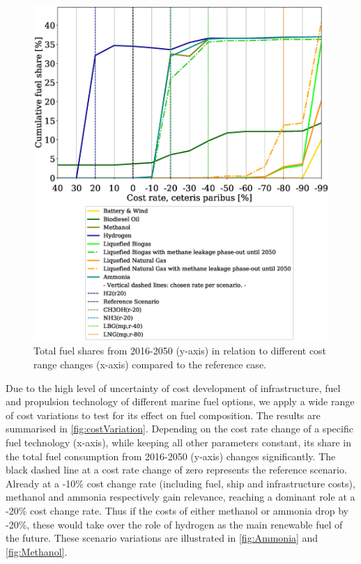 \documentclass[article]{elsarticle}
\begin{document}
\begin{figure}[t]
    \centering
    \includegraphics[width=.75\textwidth]{figures/costVariation.eps}
    \caption{Total fuel shares from 2016-2050 (y-axis) in relation to different cost range changes (x-axis) compared to the reference case.}
    \label{fig:costVariation}
\end{figure}



Due to the high level of uncertainty of cost development of infrastructure, fuel and propulsion technology of different marine fuel options, we apply a wide range of cost variations to test for its effect on fuel composition. The results are summarised in \autoref{fig:costVariation}. Depending on the cost rate change of a specific fuel technology (x-axis), while keeping all other parameters constant, its share in the total fuel consumption from 2016-2050 (y-axis) changes significantly. The black dashed line at a cost rate change of zero represents the reference scenario. Already at a -10\% cost change rate (including fuel, ship and infrastructure costs), methanol and ammonia respectively gain relevance, reaching a dominant role at a -20\% cost change rate. Thus if the costs of either methanol or ammonia drop by -20\%, these would take over the role of hydrogen as the main renewable fuel of the future. These scenario variations are illustrated in \autoref{fig:Ammonia} and \autoref{fig:Methanol}.
\end{document}
